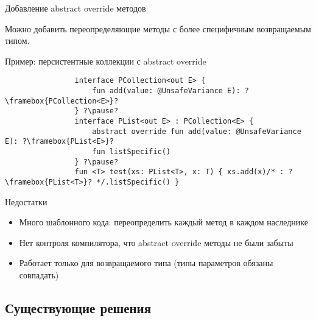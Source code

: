 \documentclass[handout,aspectratio=169,usenames,dvipsnames]{beamer}
\begin{document}
    \begin{frame}[fragile]{Добавление abstract override методов}

        Можно добавить переопределяющие методы с более специфичным возвращаемым типом.

        \begin{block}{Пример: персистентные коллекции с abstract override}
            \begin{verbatim}
                interface PCollection<out E> {
                    fun add(value: @UnsafeVariance E): ?\framebox{PCollection<E>}?
                } ?\pause?
                interface PList<out E> : PCollection<E> {
                    abstract override fun add(value: @UnsafeVariance E): ?\framebox{PList<E>}?
                    fun listSpecific()
                } ?\pause?
                fun <T> test(xs: PList<T>, x: T) { xs.add(x)/* : ?\framebox{PList<T>}? */.listSpecific() }
            \end{verbatim}
        \end{block}

        \pause

        \begin{block}{Недостатки}
            \begin{itemize}
                \item Много шаблонного кода: переопределить каждый метод в каждом наследнике
                \item Нет контроля компилятора, что abstract override методы не были забыты
                \item Работает только для возвращаемого типа (типы параметров обязаны совпадать)
            \end{itemize}
        \end{block}
    \end{frame}


    \subsection{Существующие решения}
\end{document}
